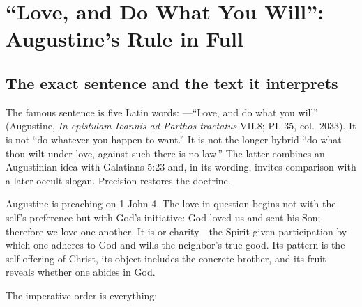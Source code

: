 \section{``Love, and Do What You Will'': Augustine's Rule in Full}

\subsection{The exact sentence and the text it interprets}

The famous sentence is five Latin words: ---``Love, and do what you will'' (Augustine, \emph{In epistulam Ioannis ad Parthos tractatus} VII.8; PL 35, col.~2033). It is not ``do whatever you happen to want.'' It is not the longer hybrid ``do what thou wilt under love, against such there is no law.'' The latter combines an Augustinian idea with Galatians 5:23 and, in its wording, invites comparison with a later occult slogan. Precision restores the doctrine.

Augustine is preaching on 1 John 4. The love in question begins not with the self's preference but with God's initiative: God loved us and sent his Son; therefore we love one another. It is  or charity---the Spirit-given participation by which one adheres to God and wills the neighbor's true good. Its pattern is the self-offering of Christ, its object includes the concrete brother, and its fruit reveals whether one abides in God.

The imperative order is everything:

\begin{center}
\end{center}

